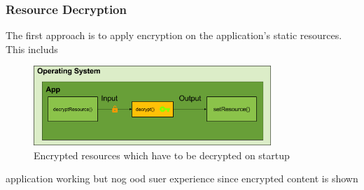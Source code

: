 \subsubsection{Resource Decryption} \label{subsection:counter-replace-encryption-content-resource}
The first approach is to apply encryption on the application's static resources.
This includs 

\begin{figure}[h]
    \centering
    \includegraphics[width=0.8\textwidth]{data/encryptionResource.png}
    \caption{Encrypted resources which have to be decrypted on startup}
    \label{fig:encryptionResource}
\end{figure}


application working but nog ood suer experience since encrypted content is shown
